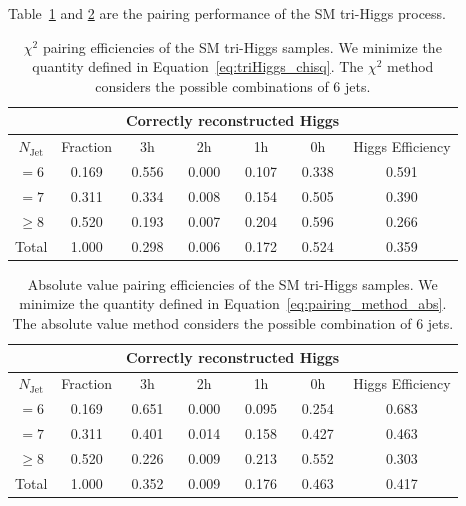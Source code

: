 \documentclass[12pt]{article}
\begin{document}
	Table~\ref{tab:chi2_pairing_triHiggs_3h_sm} and \ref{tab:abs_pairing_triHiggs_3h_sm} are the pairing performance of the SM tri-Higgs process.
    \begin{table}[htpb]
		\centering
        \caption{$\chi^2$ pairing efficiencies of the SM tri-Higgs samples. We minimize the quantity defined in Equation~\ref{eq:triHiggs_chisq}. The $\chi^2$ method considers the possible combinations of 6 jets.}
		\label{tab:chi2_pairing_triHiggs_3h_sm}
		\begin{tabular}{c|c|cccc|c}
        \multicolumn{1}{l|}{} &          & \multicolumn{4}{c|}{Correctly reconstructed Higgs} & \multicolumn{1}{l}{} \\ \hline
        $N_\text{Jet}$        & Fraction & 3h          & 2h         & 1h         & 0h         & Higgs Efficiency     \\ \hline
        $=6$                  & 0.169 & 0.556 & 0.000 & 0.107 & 0.338 & 0.591 \\
        $=7$                  & 0.311 & 0.334 & 0.008 & 0.154 & 0.505 & 0.390 \\
        $\ge 8$               & 0.520 & 0.193 & 0.007 & 0.204 & 0.596 & 0.266 \\ \hline
        Total                 & 1.000 & 0.298 & 0.006 & 0.172 & 0.524 & 0.359 
		\end{tabular}
	\end{table}
    \begin{table}[htpb]
		\centering
		\caption{Absolute value pairing efficiencies of the SM tri-Higgs samples. We minimize the quantity defined in Equation~\ref{eq:pairing_method_abs}. The absolute value method considers the possible combination of 6 jets.}
		\label{tab:abs_pairing_triHiggs_3h_sm}
		\begin{tabular}{c|c|cccc|c}
        \multicolumn{1}{l|}{} &          & \multicolumn{4}{c|}{Correctly reconstructed Higgs} & \multicolumn{1}{l}{} \\ \hline
        $N_\text{Jet}$        & Fraction & 3h          & 2h         & 1h         & 0h         & Higgs Efficiency     \\ \hline
        $=6$                  & 0.169 & 0.651 & 0.000 & 0.095 & 0.254 & 0.683 \\
        $=7$                  & 0.311 & 0.401 & 0.014 & 0.158 & 0.427 & 0.463 \\
        $\ge 8$               & 0.520 & 0.226 & 0.009 & 0.213 & 0.552 & 0.303 \\ \hline
        Total                 & 1.000 & 0.352 & 0.009 & 0.176 & 0.463 & 0.417 
		\end{tabular}
	\end{table}
\end{document}
